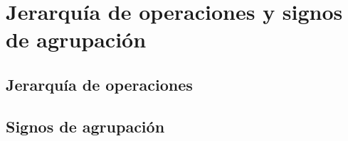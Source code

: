 \thispagestyle{plain}
\section{Jerarqu\'ia de operaciones y signos de agrupaci\'on}
\subsection{Jerarqu\'ia de operaciones}
\subsection{Signos de agrupaci\'on}
\newpage
